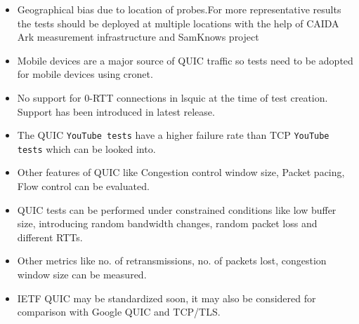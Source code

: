 \begin{frame}
\begin{itemize}
    
    \item Geographical bias due to location of probes.For more representative results the tests should be deployed at multiple locations with the help of CAIDA Ark \cite{CAIDAArk} measurement infrastructure and SamKnows project\cite{SamKnowsproject}
    
    \item Mobile devices are a major source of QUIC traffic so tests need to be adopted for mobile devices using cronet\cite{cronet}.
    
    \item No support for 0-RTT connections in lsquic at the time of test creation. Support has been introduced in latest release.
    
    \item The QUIC \texttt{YouTube tests} have a higher failure rate than TCP \texttt{YouTube tests} which can be looked into.
    
    \item Other features of QUIC like Congestion control window size, Packet pacing, Flow control can be evaluated.
    
    \item  QUIC tests can be performed under constrained conditions like low buffer size, introducing random bandwidth changes, random packet loss and different RTTs.
    
    \item  Other metrics like no. of retransmissions, no. of packets lost, congestion window size can be measured.
    
    \item IETF QUIC may be standardized soon, it may also be considered for comparison with Google QUIC and TCP/TLS.
    

\end{itemize}
\end{frame}
\clearpage
